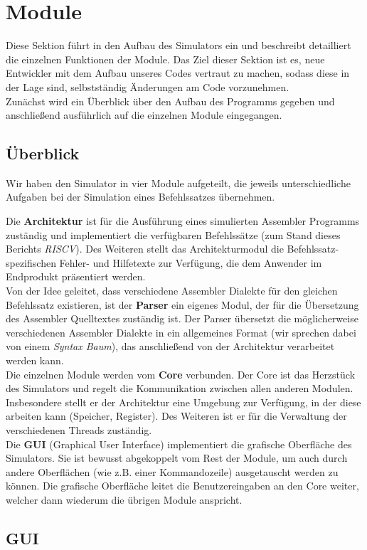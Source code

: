 
\section{Module}

Diese Sektion führt in den Aufbau des Simulators ein und beschreibt detailliert
die einzelnen Funktionen der Module. Das Ziel dieser Sektion ist es, neue
Entwickler mit dem Aufbau unseres Codes vertraut zu machen, sodass diese in der
Lage sind, selbstständig Änderungen am Code vorzunehmen. \\
Zunächst wird ein Überblick über den Aufbau des Programms gegeben und
anschließend ausführlich auf die einzelnen Module eingegangen.

\subsection{Überblick}

Wir haben den Simulator in vier Module aufgeteilt, die jeweils unterschiedliche
Aufgaben bei der Simulation eines Befehlssatzes übernehmen.

Die \textbf{Architektur} ist für die Ausführung eines simulierten Assembler
Programms zuständig und implementiert die verfügbaren Befehlssätze (zum Stand
dieses Berichts \textit{RISCV}). Des Weiteren stellt das Architekturmodul
die Befehlssatz-spezifischen Fehler- und Hilfetexte zur Verfügung, die dem
Anwender im Endprodukt präsentiert werden. \\
Von der Idee geleitet, dass verschiedene Assembler Dialekte für den gleichen
Befehlssatz existieren, ist der \textbf{Parser} ein eigenes Modul, der für die
Übersetzung des Assembler Quelltextes zuständig ist. Der Parser übersetzt die
möglicherweise verschiedenen Assembler Dialekte in ein allgemeines Format (wir
sprechen dabei von einem \textit{Syntax Baum}), das anschließend von der Architektur
verarbeitet werden kann. \\
Die einzelnen Module werden vom \textbf{Core} verbunden. Der Core ist das
Herzstück des Simulators und regelt die Kommunikation zwischen allen anderen
Modulen. Insbesondere stellt er der Architektur eine Umgebung zur Verfügung, in
der diese arbeiten kann (Speicher, Register). Des Weiteren ist er für die
Verwaltung der verschiedenen Threads zuständig. \\
Die \textbf{GUI} (Graphical User Interface) implementiert die grafische
Oberfläche des Simulators. Sie ist bewusst abgekoppelt vom Rest der Module,
um auch durch andere Oberflächen (wie z.B. einer Kommandozeile) ausgetauscht
werden zu können. Die grafische Oberfläche leitet die Benutzereingaben an den
Core weiter, welcher dann wiederum die übrigen Module anspricht.







\subsection{GUI}


